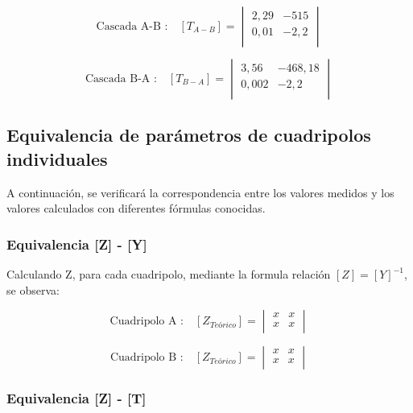 \documentclass[a4paper]{article}
\begin{document}
\begin{equation}
\text{Cascada A-B :}\quad [T_{A-B}] =
\begin{vmatrix}
	2,29 & -515\\
	0,01 & -2,2\\
\end{vmatrix}
\end{equation}

\begin{equation}
\text{Cascada B-A :}\quad [T_{B-A}] =
\begin{vmatrix}
	3,56 & -468,18\\
	0,002 & -2,2\\
\end{vmatrix}
\end{equation}

\subsection*{Equivalencia de parámetros de cuadripolos individuales}

A continuación, se verificará la correspondencia entre los valores medidos y los valores calculados con diferentes fórmulas conocidas.

\subsubsection*{Equivalencia [Z] - [Y]}

Calculando Z, para cada cuadripolo, mediante la formula relación $[Z]=[Y]^{-1}$, se observa:

\begin{equation}
\text{Cuadripolo A :}\quad [Z_{Teórico}] =
\begin{vmatrix}
	x & x\\
	x & x\\
\end{vmatrix}
\end{equation}

\begin{equation}
\text{Cuadripolo B :}\quad [Z_{Teórico}] =
\begin{vmatrix}
	x & x\\
	x & x\\
\end{vmatrix}
\end{equation}

\subsubsection*{Equivalencia [Z] - [T]}
\end{document}
